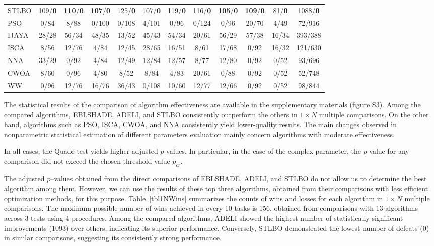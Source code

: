 \documentclass[a4paper,fleqn]{cas-sc}
\begin{document}
\begin{table}[<options>]
\begin{tabular*}{\tblwidth}{@{}LCCCCCCCCCCC@{}}
STLBO & 109/\textbf{0} & \textbf{110}/\textbf{0}  & \textbf{107}/\textbf{0}  & 125/\textbf{0}  & 107/\textbf{0}  & 119/\textbf{0}  & 116/\textbf{0}  & \textbf{105}/\textbf{0}  & \textbf{109}/\textbf{0} & 81/\textbf{0}  & 1088/\textbf{0}\\
PSO & 0/84  & 8/88  & 0/100  & 0/108  & 4/101  & 0/96  &  0/124 & 0/96  & 20/70  & 4/49  & 72/916\\
IJAYA &  28/28 &  56/34 &  48/35 & 13/52  & 45/43 &  54/34 &  20/61 & 56/29  & 57/38  & 16/34  & 393/388\\
ISCA & 8/56  & 12/76  & 4/84  & 12/45  & 28/65  & 16/51  & 8/61  & 17/68  & 0/92  & 16/32  & 121/630\\
NNA & 33/29  & 0/92  & 4/84  & 12/49  & 12/84  & 12/57  & 8/77  & 12/80  & 0/92& 0/52  & 93/696\\
CWOA & 8/60  & 0/96  &  4/80& 8/52  & 8/84& 4/83  & 20/61  & 0/88  & 0/92 & 0/52  & 52/748\\
WW & 0/96  & 12/76  & 16/76&  36/43 & 0/108 & 10/60 & 12/77  & 12/66  & 0/92& 0/52  & 98/844\\
\bottomrule
\end{tabular*}
\end{table}


The statistical results of the comparison of algorithm effectiveness are available in the supplementary materials (figure S3).
Among the compared algorithms, EBLSHADE, ADELI, and STLBO consistently outperform the others in $1\times N$ multiple comparisons.
On the other hand, algorithms such as PSO, ISCA, CWOA, and NNA consistently yield lower-quality results.
The main changes observed in nonparametric statistical estimation of different parameters evaluation
mainly concern algorithms with moderate effectiveness.



In all cases, the Quade test yields higher adjusted $p$-values.
In particular, in the case of the complex parameter, the $p$-value for any comparison did not exceed the chosen threshold value $p_{cr}$.



The adjusted $p$--values obtained from the direct comparisons of EBLSHADE, ADELI, and STLBO
do not allow us to determine the best algorithm among them.
However, we can use the results of these top three algorithms,
obtained from their comparisons with less efficient optimization methods, for this purpose.
Table~\ref{tbl1NWins} summarizes the counts of wins and losses for each algorithm in $1\times N$ multiple comparisons.
The maximum possible number of wins achieved in every 10 tasks is 156,
obtained from comparisons with 13 algorithms across 3 tests using 4 procedures.
Among the compared algorithms, ADELI showed the highest number of statistically
significant improvements (1093) over others,
indicating its superior performance.
Conversely, STLBO demonstrated the lowest number of defeats (0)
in similar comparisons, suggesting its consistently strong performance.
\end{document}
